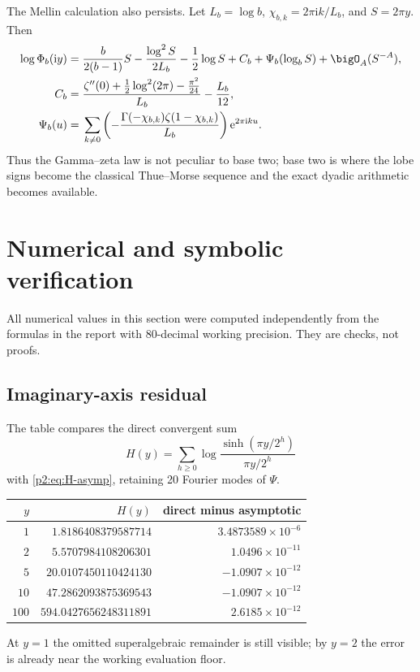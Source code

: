 \documentclass[11pt]{article}
\numberwithin{equation}{section}
\theoremstyle{definition}
\theoremstyle{remark}
\newcommand{\e}{\mathrm e}
\newcommand{\ii}{\mathrm i}
\begin{document}
The Mellin calculation also persists.  Let $L_b=\log b$,
$\chi_{b,k}=2\pi\ii k/L_b$, and $S=2\pi y$.  Then
\begin{align}
 \log\Phi_b(\ii y)
 ={}&\frac{b}{2(b-1)}S-\frac{\log^2S}{2L_b}-\frac12\log S+C_b
 +\Psi_b(\log_bS)+\bigO_A(S^{-A}),                        \label{p2:eq:baseb-asymp}\\
 C_b={}&\frac{\zeta''(0)+\tfrac12\log^2(2\pi)-\tfrac{\pi^2}{24}}{L_b}
        -\frac{L_b}{12},                                  \label{p2:eq:Cb}\\
 \Psi_b(u)={}&\sum_{k\ne0}
 \left(-\frac{\Gamma(-\chi_{b,k})\zeta(1-\chi_{b,k})}{L_b}\right)
 \e^{2\pi\ii ku}.                                        \label{p2:eq:Psib}
\end{align}
Thus the Gamma--zeta law is not peculiar to base two; base two is where the lobe
signs become the classical Thue--Morse sequence and the exact dyadic arithmetic
becomes available.

\section{Numerical and symbolic verification}
\label{p2:sec:numerics}

All numerical values in this section were computed independently from the
formulas in the report with 80-decimal working precision.  They are checks, not
proofs.

\subsection{Imaginary-axis residual}

The table compares the direct convergent sum
\begin{equation}
 H(y)=\sum_{h\ge0}\log\frac{\sinh(\pi y/2^h)}{\pi y/2^h}                  \label{p2:eq:H-direct}
\end{equation}
with \eqref{p2:eq:H-asymp}, retaining 20 Fourier modes of $\Psi$.
\begin{center}
\begin{tabular}{@{}r r r@{}}
\toprule
$y$ & $H(y)$ & direct minus asymptotic \\
\midrule
$1$   & $1.8186408379587714$   & $ 3.4873589\times10^{-6}$ \\
$2$   & $5.5707984108206301$   & $ 1.0496\times10^{-11}$ \\
$5$   & $20.0107450110424130$  & $-1.0907\times10^{-12}$ \\
$10$  & $47.2862093875369543$  & $-1.0907\times10^{-12}$ \\
$100$ & $594.0427656248311891$ & $ 2.6185\times10^{-12}$ \\
\bottomrule
\end{tabular}
\end{center}
At $y=1$ the omitted superalgebraic remainder is still visible; by $y=2$ the
error is already near the working evaluation floor.
\end{document}
